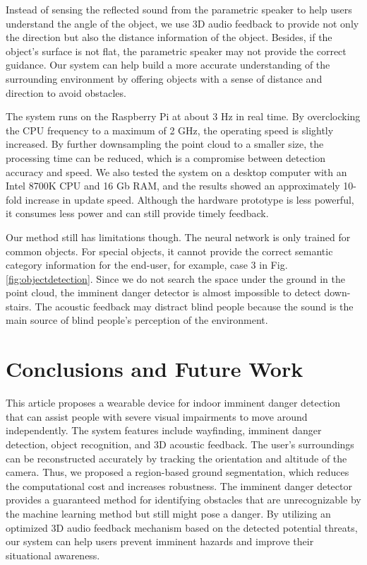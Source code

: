\documentclass{ieeeaccess}
\begin{document}
Instead of sensing the reflected sound from the parametric speaker \cite{takizawa2019kinect} to help users understand the angle of the object, we use 3D audio feedback to provide not only the direction but also the distance information of the object. Besides, if the object's surface is not flat, the parametric speaker may not provide the correct guidance. Our system can help build a more accurate understanding of the surrounding environment by offering objects with a sense of distance and direction to avoid obstacles.

The system runs on the Raspberry Pi at about 3 Hz in real time. By overclocking the CPU frequency to a maximum of 2 GHz, the operating speed is slightly increased. By further downsampling the point cloud to a smaller size, the processing time can be reduced, which is a compromise between detection accuracy and speed. We also tested the system on a desktop computer with an Intel 8700K CPU and 16 Gb RAM, and the results showed an approximately 10-fold increase in update speed. Although the hardware prototype is less powerful, it consumes less power and can still provide timely feedback.


Our method still has limitations though. The neural network is only trained for common objects. For special objects, it cannot provide the correct semantic category information for the end-user, for example, case 3 in Fig. \ref{fig:objectdetection}. Since we do not search the space under the ground in the point cloud, the imminent danger detector is almost impossible to detect down-stairs. The acoustic feedback may distract blind people because the sound is the main source of blind people's perception of the environment.


\section{Conclusions and Future Work} \label{section:conclusion}
This article proposes a wearable device for indoor imminent danger detection that can assist people with severe visual impairments to move around independently. The system features include wayfinding, imminent danger detection, object recognition, and 3D acoustic feedback. The user's surroundings can be reconstructed accurately by tracking the orientation and altitude of the camera. Thus, we proposed a region-based ground segmentation, which reduces the computational cost and increases robustness. The imminent danger detector provides a guaranteed method for identifying obstacles that are unrecognizable by the machine learning method but still might pose a danger. By utilizing an optimized 3D audio feedback mechanism based on the detected potential threats, our system can help users prevent imminent hazards and improve their situational awareness.
\end{document}
